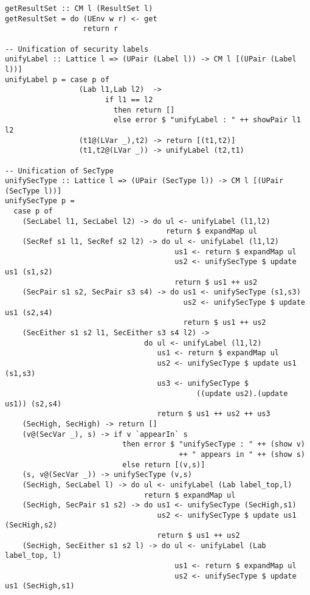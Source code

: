 \begin{Verbatim}[fontsize=\footnotesize,frame=lines,
                 framesep=5mm, label={[Unification.hs]Unification.hs}]
getResultSet :: CM l (ResultSet l)
getResultSet = do (UEnv w r) <- get
                  return r

-- Unification of security labels
unifyLabel :: Lattice l => (UPair (Label l)) -> CM l [(UPair (Label l))]
unifyLabel p = case p of
                 (Lab l1,Lab l2)  -> 
                       if l1 == l2 
                         then return []
                         else error $ "unifyLabel : " ++ showPair l1 l2
                 (t1@(LVar _),t2) -> return [(t1,t2)]
                 (t1,t2@(LVar _)) -> unifyLabel (t2,t1)

-- Unification of SecType 
unifySecType :: Lattice l => (UPair (SecType l)) -> CM l [(UPair (SecType l))]
unifySecType p = 
  case p of
    (SecLabel l1, SecLabel l2) -> do ul <- unifyLabel (l1,l2)
                                     return $ expandMap ul
    (SecRef s1 l1, SecRef s2 l2) -> do ul <- unifyLabel (l1,l2)
                                       us1 <- return $ expandMap ul
                                       us2 <- unifySecType $ update us1 (s1,s2)
                                       return $ us1 ++ us2
    (SecPair s1 s2, SecPair s3 s4) -> do us1 <- unifySecType (s1,s3)
                                         us2 <- unifySecType $ update us1 (s2,s4)
                                         return $ us1 ++ us2
    (SecEither s1 s2 l1, SecEither s3 s4 l2) -> 
                                do ul <- unifyLabel (l1,l2)
                                   us1 <- return $ expandMap ul
                                   us2 <- unifySecType $ update us1 (s1,s3)
                                   us3 <- unifySecType $ 
                                            ((update us2).(update us1)) (s2,s4)
                                   return $ us1 ++ us2 ++ us3
    (SecHigh, SecHigh) -> return []
    (v@(SecVar _), s) -> if v `appearIn` s
                           then error $ "unifySecType : " ++ (show v) 
                                        ++ " appears in " ++ (show s)
                           else return [(v,s)]
    (s, v@(SecVar _)) -> unifySecType (v,s)
    (SecHigh, SecLabel l) -> do ul <- unifyLabel (Lab label_top,l)
                                return $ expandMap ul
    (SecHigh, SecPair s1 s2) -> do us1 <- unifySecType (SecHigh,s1)
                                   us2 <- unifySecType $ update us1 (SecHigh,s2)
                                   return $ us1 ++ us2
    (SecHigh, SecEither s1 s2 l) -> do ul <- unifyLabel (Lab label_top, l)
                                       us1 <- return $ expandMap ul
                                       us2 <- unifySecType $ update us1 (SecHigh,s1)

\end{Verbatim}

